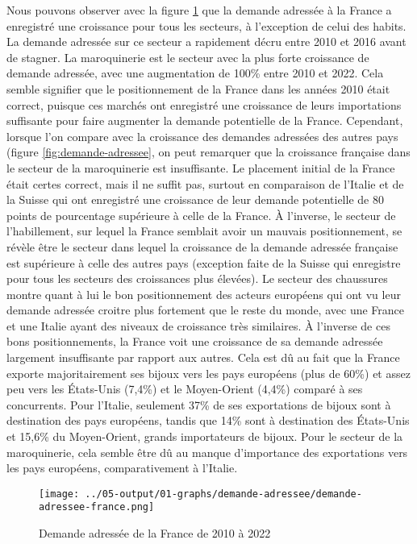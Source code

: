 \documentclass[french,10pt,a4paper]{article}
\begin{document}
Nous pouvons observer avec la figure \ref{fig:demande-adressee-france} que la demande adressée à la France a enregistré une croissance pour tous les secteurs, à l'exception de celui des habits. La demande adressée sur ce secteur a rapidement décru entre 2010 et 2016 avant de stagner. La maroquinerie est le secteur avec la plus forte croissance de demande adressée, avec une augmentation de 100\% entre 2010 et 2022. Cela semble signifier que le positionnement de la France dans les années 2010 était correct, puisque ces marchés ont enregistré une croissance de leurs importations suffisante pour faire augmenter la demande potentielle de la France. Cependant, lorsque l'on compare avec la croissance des demandes adressées des autres pays (figure \ref{fig:demande-adressee}, on peut remarquer que la croissance française dans le secteur de la maroquinerie est insuffisante. Le placement initial de la France était certes correct, mais il ne suffit pas, surtout en comparaison de l'Italie et de la Suisse qui ont enregistré une croissance de leur demande potentielle de 80 points de pourcentage supérieure à celle de la France. À l'inverse, le secteur de l'habillement, sur lequel la France semblait avoir un mauvais positionnement, se révèle être le secteur dans lequel la croissance de la demande adressée française est supérieure à celle des autres pays (exception faite de la Suisse qui enregistre pour tous les secteurs des croissances plus élevées). Le secteur des chaussures montre quant à lui le bon positionnement des acteurs européens qui ont vu leur demande adressée croitre plus fortement que le reste du monde, avec une France et une Italie ayant des niveaux de croissance très similaires. À l'inverse de ces bons positionnements, la France voit une croissance de sa demande adressée largement insuffisante par rapport aux autres. Cela est dû au fait que la France exporte majoritairement ses bijoux vers les pays européens (plus de 60\%) et assez peu vers les États-Unis (7,4\%) et le Moyen-Orient (4,4\%) comparé à ses concurrents. Pour l'Italie, seulement 37\% de ses exportations de bijoux sont à destination des pays européens, tandis que 14\% sont à destination des États-Unis et 15,6\% du Moyen-Orient, grands importateurs de bijoux. Pour le secteur de la maroquinerie, cela semble être dû au manque d'importance des exportations vers les pays européens, comparativement à l'Italie. 


\begin{figure}[!h]
  \centering  \texttt{[image: ../05-output/01-graphs/demande-adressee/demande-adressee-france.png]}
  \caption{Demande adressée de la France de 2010 à 2022}
  \label{fig:demande-adressee-france}
\end{figure}
\end{document}
